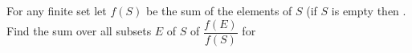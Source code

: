 For any finite set  let $f(S)$ be the sum of the elements of $S$ (if $S$ is empty then .  Find the sum over all subsets $E$ of $S$ of $\dfrac{f(E)}{f(S)}$ for 
